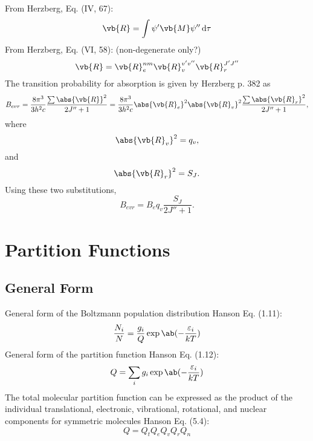 \documentclass[11pt, twoside, fleqn]{report}
\begin{document}
    From Herzberg, Eq. (IV, 67):
    \begin{equation*}
        \vb{R} = \int \psi'\vb{M}\psi'' \odif{\tau}
    \end{equation*}
    From Herzberg, Eq. (VI, 58): (non-degenerate only?)
    \begin{equation*}
        \vb{R} = \vb{R}_{e}^{nm}\vb{R}_{v}^{v'v''}\vb{R}_{r}^{J'J''}
    \end{equation*}
    The transition probability for absorption is given by Herzberg p. 382 as
    \begin{equation*}
        B_{evr} = \frac{8\pi^{3}}{3h^{2}c}\frac{\sum\abs{\vb{R}}^{2}}{2J'' + 1} = \frac{8\pi^{3}}{3h^{2}c}\abs{\vb{R}_{e}}^{2}\abs{\vb{R}_{v}}^{2}\frac{\sum\abs{\vb{R}_{r}}^{2}}{2J'' + 1},
    \end{equation*}
    where
    \begin{equation*}
        \abs{\vb{R}_{v}}^{2} = q_{v},
    \end{equation*}
    and
    \begin{equation*}
        \abs{\vb{R}_{r}}^{2} = S_{J}.
    \end{equation*}
    Using these two substitutions,
    \begin{equation*}
        B_{evr} = B_{e}q_{v}\frac{S_{J}}{2J'' + 1}.
    \end{equation*}

    \section{Partition Functions}

    \subsection{General Form}

    General form of the Boltzmann population distribution Hanson Eq. (1.11):
    \begin{equation*}
        \frac{N_{i}}{N} = \frac{g_{i}}{Q}\exp\ab(-\frac{\varepsilon_{i}}{kT})
    \end{equation*}
    General form of the partition function Hanson Eq. (1.12):
    \begin{equation*}
        Q = \sum_{i} g_{i}\exp\ab(-\frac{\varepsilon_{i}}{kT})
    \end{equation*}
    The total molecular partition function can be expressed as the product of the individual translational, electronic, vibrational, rotational, and nuclear components for symmetric molecules Hanson Eq. (5.4):
    \begin{equation*}
        Q = Q_{t}Q_{e}Q_{v}Q_{r}Q_{n}
    \end{equation*}
\end{document}
